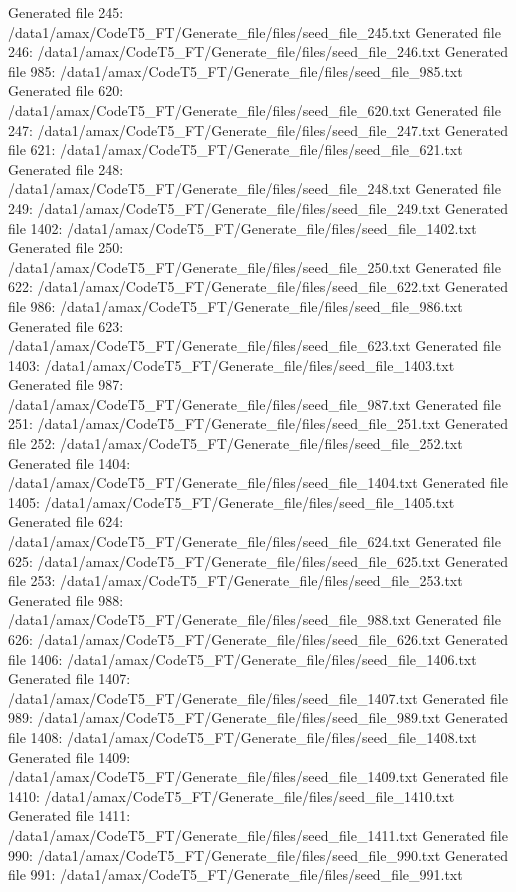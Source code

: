 Generated file 245: /data1/amax/CodeT5_FT/Generate_file/files/seed_file_245.txt
Generated file 246: /data1/amax/CodeT5_FT/Generate_file/files/seed_file_246.txt
Generated file 985: /data1/amax/CodeT5_FT/Generate_file/files/seed_file_985.txt
Generated file 620: /data1/amax/CodeT5_FT/Generate_file/files/seed_file_620.txt
Generated file 247: /data1/amax/CodeT5_FT/Generate_file/files/seed_file_247.txt
Generated file 621: /data1/amax/CodeT5_FT/Generate_file/files/seed_file_621.txt
Generated file 248: /data1/amax/CodeT5_FT/Generate_file/files/seed_file_248.txt
Generated file 249: /data1/amax/CodeT5_FT/Generate_file/files/seed_file_249.txt
Generated file 1402: /data1/amax/CodeT5_FT/Generate_file/files/seed_file_1402.txt
Generated file 250: /data1/amax/CodeT5_FT/Generate_file/files/seed_file_250.txt
Generated file 622: /data1/amax/CodeT5_FT/Generate_file/files/seed_file_622.txt
Generated file 986: /data1/amax/CodeT5_FT/Generate_file/files/seed_file_986.txt
Generated file 623: /data1/amax/CodeT5_FT/Generate_file/files/seed_file_623.txt
Generated file 1403: /data1/amax/CodeT5_FT/Generate_file/files/seed_file_1403.txt
Generated file 987: /data1/amax/CodeT5_FT/Generate_file/files/seed_file_987.txt
Generated file 251: /data1/amax/CodeT5_FT/Generate_file/files/seed_file_251.txt
Generated file 252: /data1/amax/CodeT5_FT/Generate_file/files/seed_file_252.txt
Generated file 1404: /data1/amax/CodeT5_FT/Generate_file/files/seed_file_1404.txt
Generated file 1405: /data1/amax/CodeT5_FT/Generate_file/files/seed_file_1405.txt
Generated file 624: /data1/amax/CodeT5_FT/Generate_file/files/seed_file_624.txt
Generated file 625: /data1/amax/CodeT5_FT/Generate_file/files/seed_file_625.txt
Generated file 253: /data1/amax/CodeT5_FT/Generate_file/files/seed_file_253.txt
Generated file 988: /data1/amax/CodeT5_FT/Generate_file/files/seed_file_988.txt
Generated file 626: /data1/amax/CodeT5_FT/Generate_file/files/seed_file_626.txt
Generated file 1406: /data1/amax/CodeT5_FT/Generate_file/files/seed_file_1406.txt
Generated file 1407: /data1/amax/CodeT5_FT/Generate_file/files/seed_file_1407.txt
Generated file 989: /data1/amax/CodeT5_FT/Generate_file/files/seed_file_989.txt
Generated file 1408: /data1/amax/CodeT5_FT/Generate_file/files/seed_file_1408.txt
Generated file 1409: /data1/amax/CodeT5_FT/Generate_file/files/seed_file_1409.txt
Generated file 1410: /data1/amax/CodeT5_FT/Generate_file/files/seed_file_1410.txt
Generated file 1411: /data1/amax/CodeT5_FT/Generate_file/files/seed_file_1411.txt
Generated file 990: /data1/amax/CodeT5_FT/Generate_file/files/seed_file_990.txt
Generated file 991: /data1/amax/CodeT5_FT/Generate_file/files/seed_file_991.txt
